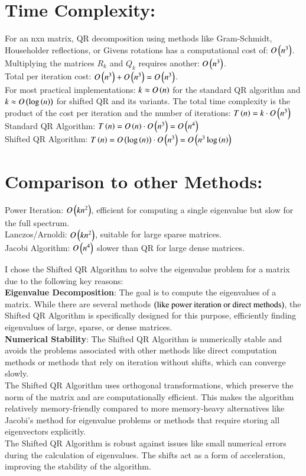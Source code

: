\documentclass[journal]{IEEEtran}
\numberwithin{equation}{enumi}
\numberwithin{figure}{enumi}
\begin{document}
\section{\textbf{Time Complexity:}}
For an nxn matrix, QR decomposition using methods like Gram-Schmidt, Householder reflections, or Givens rotations has a computational cost of: $O\left(n^3\right)$. \\
Multiplying the matrices $R_k$ and $Q_k$ requires another: $O\left(n^3\right)$. \\
Total per iteration cost: $O\left(n^3\right) + O\left(n^3\right) = O\left(n^3\right)$. \\
For most practical implementations: 
$k \approx O\left(n\right)$ for the standard QR algorithm and $k \approx O\left(\log\left(n\right)\right)$ for shifted QR and its variants.
The total time complexity is the product of the cost per iteration and the number of iterations: $T\left(n\right) = k \cdot O\left(n^3\right)$ \\
Standard QR Algorithm: $T\left(n\right) = O\left(n\right) \cdot O\left(n^3\right) = O\left(n^4\right)$ \\
Shifted QR Algorithm: $T\left(n\right) = O\left(\log\left(n\right)\right) \cdot O\left(n^3\right) = O\left(n^3\log\left(n\right)\right)$ \\
\section{\textbf{Comparison to other Methods:}}
Power Iteration: $O\left(kn^2\right)$, efficient for computing a single eigenvalue but slow for the full spectrum. \\
Lanczos/Arnoldi: $O\left(kn^2\right)$, suitable for large sparse matrices. \\
Jacobi Algorithm: $O\left(n^4\right)$ slower than QR for large dense matrices.
\begin{table}[H]
	\centering
	
\end{table}
I chose the Shifted QR Algorithm to solve the eigenvalue problem for a matrix due to the following key reasons: \\
\textbf{Eigenvalue Decomposition}: The goal is to compute the eigenvalues of a matrix. While there are several methods $\left(\text{like power iteration or direct methods}\right)$, the Shifted QR Algorithm is specifically designed for this purpose, efficiently finding eigenvalues of large, sparse, or dense matrices. \\
\textbf{Numerical Stability}: The Shifted QR Algorithm is numerically stable and avoids the problems associated with other methods like direct computation methods or methods that rely on iteration without shifts, which can converge slowly. \\
The Shifted QR Algorithm uses orthogonal transformations, which preserve the norm of the matrix and are computationally efficient. This makes the algorithm relatively memory-friendly compared to more memory-heavy alternatives like Jacobi's method for eigenvalue problems or methods that require storing all eigenvectors explicitly. \\
The Shifted QR Algorithm is robust against issues like small numerical errors during the calculation of eigenvalues. The shifts act as a form of acceleration, improving the stability of the algorithm.
\end{document}
